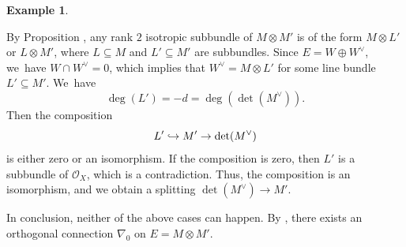 \documentclass[11pt]{article}
\numberwithin{equation}{section}
\newcommand\hto{\mathrel{\lhook\joinrel\to}}
\theoremstyle{plain}
\theoremstyle{definition}
\newtheorem{examp}[thm]{Example}
\begin{document}
\begin{examp}
\begin{itemize}
\begin{enumerate}
By Proposition \cite[Prop.\,4.5]{CH23}, any rank $2$ isotropic subbundle of $M \otimes M'$ is of the form $M \otimes L'$ or $L \otimes M'$, where $L \subseteq M$ and $L' \subseteq M'$ are subbundles. Since $E=W \oplus W^{\vee}$, we~have $W \cap W^{\vee} = 0$, which implies that $W^\vee = M \otimes L'$ for some line bundle $L' \subseteq M'$. We~have
\[
\deg(L') = -d = \deg(\det(M^{\vee})).
\]
Then the composition
\[
L' \hto M' \to \det(M^{\vee})
\]
is either zero or an isomorphism. If the composition is zero, then $L'$ is a subbundle of $\mathcal{O}_X$, which is a contradiction. Thus, the composition is an isomorphism, and we obtain a splitting $\det(M^{\vee}) \to M'$.
\end{enumerate}
\end{itemize}
In conclusion, neither of the above cases can happen. By \cite[Th.\,4.2]{BMW11}, there exists an orthogonal connection $\nabla_0$ on $E = M \otimes M'$.
\end{examp}
\end{document}
